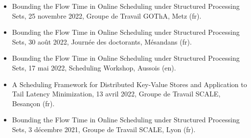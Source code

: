 \documentclass[12pt]{article}
\begin{document}
\begin{itemize}
  \item \foreignlanguage{english}{Bounding the Flow Time in Online Scheduling under Structured
  Processing Sets}, 25 novembre 2022, Groupe de Travail GOThA, Metz (fr).
  \item \foreignlanguage{english}{Bounding the Flow Time in Online Scheduling under Structured
  Processing Sets}, 30 août 2022, Journée des doctorants, Mésandans (fr).
  \item \foreignlanguage{english}{Bounding the Flow Time in Online Scheduling under Structured
  Processing Sets}, 17 mai 2022, Scheduling Workshop, Aussois (en).
  \item \foreignlanguage{english}{A Scheduling Framework for Distributed Key-Value Stores and
  Application to Tail Latency Minimization}, 13 avril 2022, Groupe de Travail SCALE, Besançon (fr).
  \item \foreignlanguage{english}{Bounding the Flow Time in Online Scheduling under Structured
  Processing Sets}, 3 décembre 2021, Groupe de Travail SCALE, Lyon (fr).
\end{itemize}

% 
% 
\end{document}
